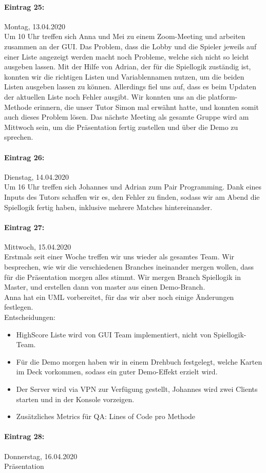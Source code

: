 \documentclass[12pt]{article}
\begin{document}
\paragraph{Eintrag 25:}
Montag, 13.04.2020\\
Um 10 Uhr treffen sich Anna und Mei zu einem Zoom-Meeting und arbeiten zusammen an der GUI. Das Problem, dass die Lobby und die Spieler jeweils auf einer Liste angezeigt werden macht noch Probleme, welche sich nicht so leicht ausgeben lassen. Mit der Hilfe von Adrian, der f\"ur die Spiellogik zust\"andig ist, konnten wir die richtigen Listen und Variablennamen nutzen, um die beiden Listen ausgeben lassen zu k\"onnen. Allerdings fiel uns auf, dass es beim Updaten der aktuellen Liste noch Fehler ausgibt. Wir konnten uns an die platform-Methode erinnern, die unser Tutor Simon mal erw\"ahnt hatte, und konnten somit auch dieses Problem l\"osen. Das n\"achste Meeting als gesamte Gruppe wird am Mittwoch sein, um die Pr\"asentation fertig zustellen und \"uber die Demo zu sprechen.

\paragraph{Eintrag 26:}
Dienstag, 14.04.2020\\
Um 16 Uhr treffen sich Johannes und Adrian zum Pair Programming. Dank eines Inputs des Tutors schaffen wir es, den Fehler zu finden, sodass wir am Abend die Spiellogik fertig haben, inklusive mehrere Matches hintereinander.

\paragraph{Eintrag 27:}
Mittwoch, 15.04.2020\\
Erstmals seit einer Woche treffen wir uns wieder als gesamtes Team. Wir besprechen, wie wir die verschiedenen Branches ineinander mergen wollen, dass f\"ur die Pr\"asentation morgen alles stimmt. Wir mergen Branch Spiellogik in Master, und erstellen dann von master aus einen Demo-Branch.\\ Anna hat ein UML vorbereitet, f\"ur das wir aber noch einige \"Anderungen festlegen.\\
Entscheidungen:
\begin{itemize}
\item HighScore Liste wird von GUI Team implementiert, nicht von Spiellogik-Team.
\item F\"ur die Demo morgen haben wir in einem Drehbuch festgelegt, welche Karten im Deck vorkommen, sodass ein guter Demo-Effekt erzielt wird. 
\item Der Server wird via VPN zur Verfügung gestellt, Johannes wird zwei Clients starten und in der Konsole vorzeigen.
\item Zus\"atzliches Metrics f\"ur QA: Lines of Code pro Methode
\end{itemize}

\paragraph{Eintrag 28:}
Donnerstag, 16.04.2020\\
Pr\"asentation
\end{document}
